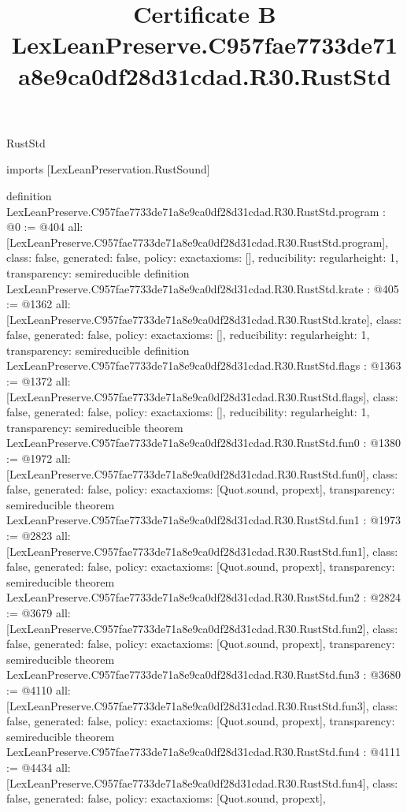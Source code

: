 \begin{lexlean}{RustStd}
\title{Certificate B LexLeanPreserve.C957fae7733de71a8e9ca0df28d31cdad.R30.RustStd}
\begin{coremodule}
imports [LexLeanPreservation.RustSound]

definition LexLeanPreserve.C957fae7733de71a8e9ca0df28d31cdad.R30.RustStd.program : @0 := @404 {
  all: [LexLeanPreserve.C957fae7733de71a8e9ca0df28d31cdad.R30.RustStd.program],
  class: false,
  generated: false,
  policy: exact{axioms: []},
  reducibility: regular{height: 1},
  transparency: semireducible
}
definition LexLeanPreserve.C957fae7733de71a8e9ca0df28d31cdad.R30.RustStd.krate : @405 := @1362 {
  all: [LexLeanPreserve.C957fae7733de71a8e9ca0df28d31cdad.R30.RustStd.krate],
  class: false,
  generated: false,
  policy: exact{axioms: []},
  reducibility: regular{height: 1},
  transparency: semireducible
}
definition LexLeanPreserve.C957fae7733de71a8e9ca0df28d31cdad.R30.RustStd.flags : @1363 := @1372 {
  all: [LexLeanPreserve.C957fae7733de71a8e9ca0df28d31cdad.R30.RustStd.flags],
  class: false,
  generated: false,
  policy: exact{axioms: []},
  reducibility: regular{height: 1},
  transparency: semireducible
}
theorem LexLeanPreserve.C957fae7733de71a8e9ca0df28d31cdad.R30.RustStd.fun0 : @1380 := @1972 {
  all: [LexLeanPreserve.C957fae7733de71a8e9ca0df28d31cdad.R30.RustStd.fun0],
  class: false,
  generated: false,
  policy: exact{axioms: [Quot.sound, propext]},
  transparency: semireducible
}
theorem LexLeanPreserve.C957fae7733de71a8e9ca0df28d31cdad.R30.RustStd.fun1 : @1973 := @2823 {
  all: [LexLeanPreserve.C957fae7733de71a8e9ca0df28d31cdad.R30.RustStd.fun1],
  class: false,
  generated: false,
  policy: exact{axioms: [Quot.sound, propext]},
  transparency: semireducible
}
theorem LexLeanPreserve.C957fae7733de71a8e9ca0df28d31cdad.R30.RustStd.fun2 : @2824 := @3679 {
  all: [LexLeanPreserve.C957fae7733de71a8e9ca0df28d31cdad.R30.RustStd.fun2],
  class: false,
  generated: false,
  policy: exact{axioms: [Quot.sound, propext]},
  transparency: semireducible
}
theorem LexLeanPreserve.C957fae7733de71a8e9ca0df28d31cdad.R30.RustStd.fun3 : @3680 := @4110 {
  all: [LexLeanPreserve.C957fae7733de71a8e9ca0df28d31cdad.R30.RustStd.fun3],
  class: false,
  generated: false,
  policy: exact{axioms: [Quot.sound, propext]},
  transparency: semireducible
}
theorem LexLeanPreserve.C957fae7733de71a8e9ca0df28d31cdad.R30.RustStd.fun4 : @4111 := @4434 {
  all: [LexLeanPreserve.C957fae7733de71a8e9ca0df28d31cdad.R30.RustStd.fun4],
  class: false,
  generated: false,
  policy: exact{axioms: [Quot.sound, propext]},
}
\end{coremodule}
\end{lexlean}
